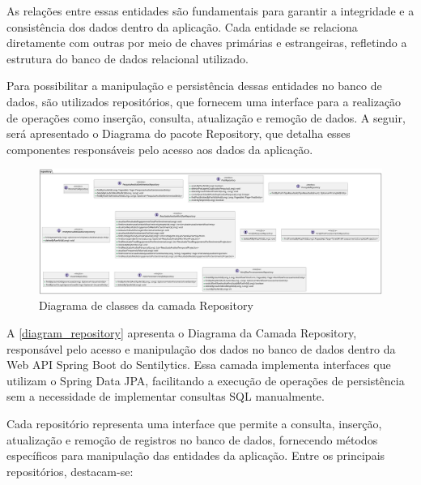 \documentclass[
	12pt,				%
	oneside,			%
	a4paper,			%
	english,			%
	french,				%
	spanish,			%
	brazil				%
	]{abntex2}
\begin{document}
As relações entre essas entidades são fundamentais para garantir a
integridade e a consistência dos dados dentro da aplicação. Cada
entidade se relaciona diretamente com outras por meio de chaves
primárias e estrangeiras, refletindo a estrutura do banco de dados
relacional utilizado.

Para possibilitar a manipulação e persistência dessas entidades no banco
de dados, são utilizados repositórios, que fornecem uma interface para a
realização de operações como inserção, consulta, atualização e remoção
de dados. A seguir, será apresentado o Diagrama do pacote Repository,
que detalha esses componentes responsáveis pelo acesso aos dados da
aplicação.

\begin{figure}[htbp]
\hypertarget{diagram_repository}{%
\caption{Diagrama de classes da camada Repository}\label{diagram_repository}
\begin{center}
\includegraphics[scale=0.2]{imagens/sentilytics/diagramas/classes/repository-classes.png}
\end{center}
}
\end{figure}

A \autoref{diagram_repository} apresenta o Diagrama da Camada
Repository, responsável pelo acesso e manipulação dos dados no banco de
dados dentro da Web API Spring Boot do Sentilytics. Essa camada
implementa interfaces que utilizam o Spring Data JPA, facilitando a
execução de operações de persistência sem a necessidade de implementar
consultas SQL manualmente.

Cada repositório representa uma interface que permite a consulta,
inserção, atualização e remoção de registros no banco de dados,
fornecendo métodos específicos para manipulação das entidades da
aplicação. Entre os principais repositórios, destacam-se:
\end{document}

